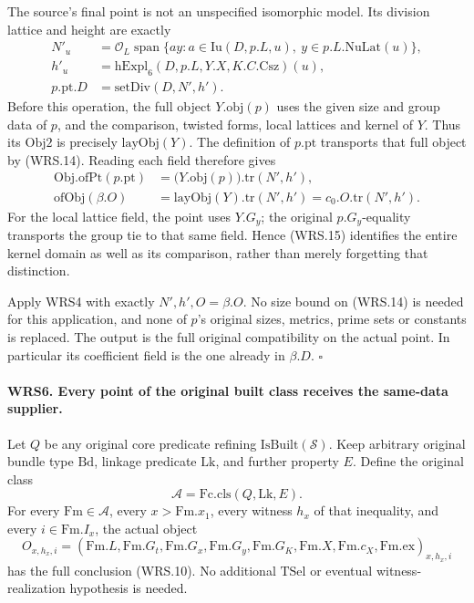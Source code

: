 \documentclass[11pt,a4paper]{article}
\numberwithin{equation}{section}
\theoremstyle{remark}\newtheorem{remark}[theorem]{Remark}
\begin{document}
The source's final point is not an unspecified isomorphic model.
Its division lattice and height are exactly
\[
 \begin{aligned}
 N'_u&=\mathcal O_L\operatorname{span}
       \{a y:a\in\mathrm{Iu}(D,p.L,u),\ y\in p.L.\mathrm{NuLat}(u)\},\\
 h'_u&=\mathrm{hExpl}_6(D,p.L,Y.X,K.C.\mathrm{Csz})(u),\\
 p.\mathrm{pt}.D&=\mathrm{setDiv}(D,N',h').
 \end{aligned}                                                    \tag{WRS.14}
\]
Before this operation, the full object \(Y.\mathrm{obj}(p)\)
uses the given size and group data of \(p\), and the comparison,
twisted forms, local lattices and kernel of \(Y\).
Thus its \(\mathrm{Obj2}\) is precisely \(\mathrm{layObj}(Y)\).
The definition of \(p.\mathrm{pt}\) transports that full object
by (WRS.14).  Reading each field therefore gives
\[
 \begin{aligned}
 \mathrm{Obj.ofPt}(p.\mathrm{pt})
       &=\bigl(Y.\mathrm{obj}(p)\bigr).\mathrm{tr}(N',h'),\\
 \mathrm{ofObj}(\beta.O)
       &=\mathrm{layObj}(Y).\mathrm{tr}(N',h')
        =c_0.O.\mathrm{tr}(N',h').
 \end{aligned}                                                    \tag{WRS.15}
\]
For the local lattice field, the point uses \(Y.G_y\); the
original \(p.G_y\)-equality transports the group tie to that same
field.  Hence (WRS.15) identifies the entire kernel domain as well
as its comparison, rather than merely forgetting that distinction.

Apply WRS4 with exactly \(N',h',O=\beta.O\).
No size bound on (WRS.14) is needed for this application, and none
of \(p\)'s original sizes, metrics, prime sets or constants is
replaced.  The output is the full original compatibility on the
actual point.  In particular its coefficient field is the one
already in \(\beta.D\).
\hfill\(\square\)

\paragraph{WRS6. Every point of the original built class receives the same-data supplier.}
\label{claim:WRS6}
Let \(Q\) be any original core predicate refining
\(\mathrm{IsBuilt}(\mathcal S)\).  Keep arbitrary original bundle
type \(\mathrm{Bd}\), linkage predicate \(\mathrm{Lk}\), and
further property \(E\).  Define the original class
\[
                \mathcal A=\mathrm{Fc.cls}(Q,\mathrm{Lk},E).
 \tag{WRS.16}
\]
For every \(\mathrm{Fm}\in\mathcal A\), every
\(x>\mathrm{Fm}.x_1\), every witness \(h_x\) of that inequality,
and every \(i\in\mathrm{Fm}.I_x\), the actual object
\[
 O_{x,h_x,i}=
 (\mathrm{Fm}.L,\mathrm{Fm}.G_t,\mathrm{Fm}.G_x,
  \mathrm{Fm}.G_y,\mathrm{Fm}.G_K,\mathrm{Fm}.X,
  \mathrm{Fm}.c_X,\mathrm{Fm}.\mathrm{ex})_{x,h_x,i}
 \tag{WRS.17}
\]
has the full conclusion (WRS.10).  No additional \(\mathrm{TSel}\)
or eventual witness-realization hypothesis is needed.
\end{document}
